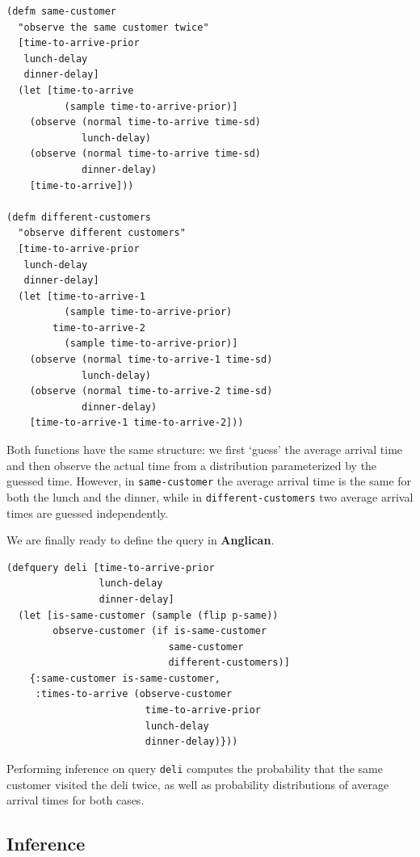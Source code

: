 \documentclass[preprint]{sigplanconf}
\begin{document}
\begin{lstlisting}[style=default]
(defm same-customer 
  "observe the same customer twice"
  [time-to-arrive-prior
   lunch-delay
   dinner-delay]
  (let [time-to-arrive
          (sample time-to-arrive-prior)]
    (observe (normal time-to-arrive time-sd) 
             lunch-delay)
    (observe (normal time-to-arrive time-sd)
             dinner-delay)
    [time-to-arrive]))

(defm different-customers
  "observe different customers"
  [time-to-arrive-prior
   lunch-delay
   dinner-delay]
  (let [time-to-arrive-1
          (sample time-to-arrive-prior)
        time-to-arrive-2
          (sample time-to-arrive-prior)]
    (observe (normal time-to-arrive-1 time-sd) 
             lunch-delay)
    (observe (normal time-to-arrive-2 time-sd)
             dinner-delay)
    [time-to-arrive-1 time-to-arrive-2]))
\end{lstlisting}

Both functions have the same structure: we first `guess' the
average arrival time and then observe the actual time from a
distribution parameterized by the guessed time. However, in
\texttt{same-customer} the average arrival time is the same for
both the lunch and the dinner, while in
\texttt{different-customers} two average arrival times are
guessed independently.

We are finally ready to define the query in \textbf{Anglican}.

\begin{lstlisting}[style=default]
(defquery deli [time-to-arrive-prior
                lunch-delay
                dinner-delay]
  (let [is-same-customer (sample (flip p-same))
        observe-customer (if is-same-customer
                            same-customer
                            different-customers)]
    {:same-customer is-same-customer,
     :times-to-arrive (observe-customer 
                        time-to-arrive-prior
                        lunch-delay
                        dinner-delay)}))
\end{lstlisting}

Performing inference on query \texttt{deli} computes the
probability that the same customer visited the deli twice, as
well as probability distributions of average arrival times for
both cases.

\subsection{Inference}
\label{seq:deli-inference}
\end{document}
